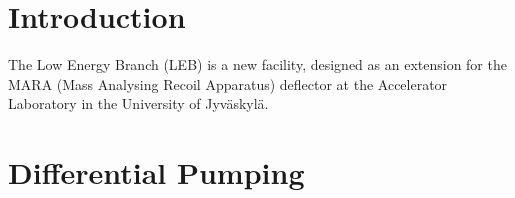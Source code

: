 





\section{Introduction}
The Low Energy Branch (LEB) is a new facility, designed as an extension for the MARA (Mass Analysing Recoil Apparatus) deflector at the Accelerator Laboratory in the University of Jyväskylä.
\section{Differential Pumping}




